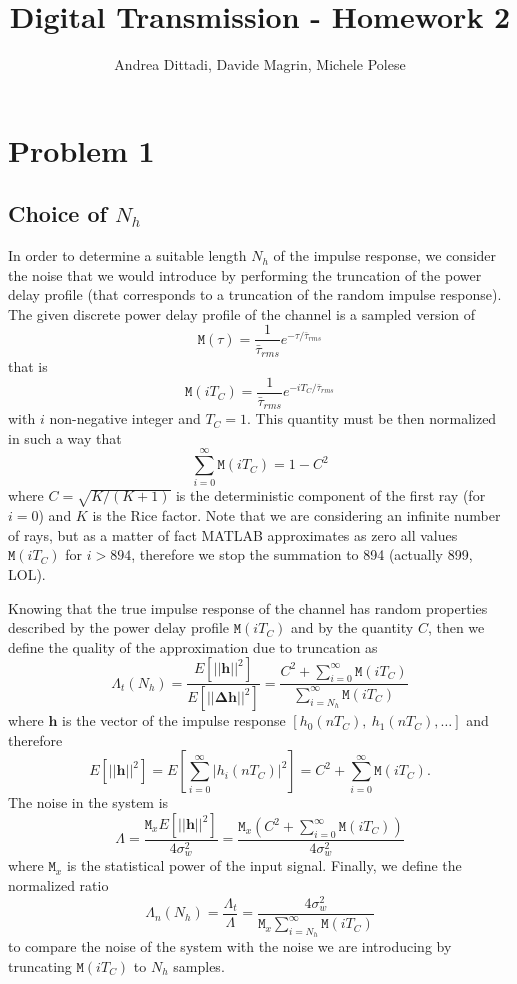 \documentclass[10pt]{article}
\newcommand{\M} {\mathtt{M}}
\numberwithin{equation}{section}
\begin{document}
\title{Digital Transmission - Homework 2}
\author{Andrea Dittadi, Davide Magrin, Michele Polese}

\maketitle

\section*{Problem 1}

\subsection*{Choice of $N_h$}

In order to determine a suitable length $N_h$ of the impulse response, we consider the noise that we would introduce by performing the truncation of the power delay profile (that corresponds to a truncation of the random impulse response). The given discrete power delay profile of the channel is a sampled version of
$$ \M(\tau) = \frac{1}{\bar{\tau}_{rms}} e^{-\tau / \bar{\tau}_{rms}} $$
that is
$$ \M(iT_C) = \frac{1}{\bar{\tau}_{rms}} e^{-iT_C / \bar{\tau}_{rms}} $$
with $i$ non-negative integer and $T_C = 1$. This quantity must be then normalized in such a way that
$$\sum_{i=0}^{\infty} \M(iT_C) = 1 - C^2 $$
where $C = \sqrt{K / (K+1)}$ is the deterministic component of the first ray (for $i=0$) and $K$ is the Rice factor. Note that we are considering an infinite number of rays, but as a matter of fact MATLAB approximates as zero all values $\M(iT_C)$ for $i > 894$, therefore we stop the summation to 894 (actually 899, LOL).

Knowing that the true impulse response of the channel has random properties described by the power delay profile $\M(iT_C)$ and by the quantity $C$, then we define the quality of the approximation due to truncation as
$$ \Lambda_t(N_h) = \frac{E[||\mathbf{h}||^2]}{E[||\mathbf{\Delta h}||^2]} = \frac{C^2 + \sum_{i=0}^{\infty} \M(iT_C)}{\sum_{i=N_h}^{\infty} \M(iT_C)} $$
where $\mathbf{h}$ is the vector of the impulse response $[h_0(nT_C),~h_1(nT_C),\ldots]$ and therefore
$$ E[||\mathbf{h}||^2] = E[\sum_{i=0}^{\infty} |h_i(nT_C)|^2] = C^2 + \sum_{i=0}^{\infty} \M(iT_C). $$
The noise in the system is
$$ \Lambda = \frac{\M_x E[||\mathbf{h}||^2]}{4 \sigma_w^2} = \frac{\M_x (C^2 + \sum_{i=0}^{\infty} \M(iT_C))}{4 \sigma_w^2} $$
where $\M_x$ is the statistical power of the input signal. Finally, we define the normalized ratio
$$ \Lambda_n (N_h) = \frac{\Lambda_t}{\Lambda} = \frac{4 \sigma_w^2}{\M_x \sum_{i=N_h}^{\infty} \M(iT_C)} $$
to compare the noise of the system with the noise we are introducing by truncating $\M(iT_C)$ to $N_h$ samples.
\end{document}
